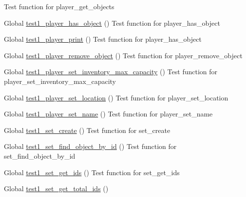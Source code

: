 \begin{DoxyRefList}
%
Test function for player\+\_\+get\+\_\+objects  
\item[Global \mbox{\hyperlink{player__test_8c_abedc0e75ebffb4e7224f5e5ac0ee3055}{test1\+\_\+player\+\_\+has\+\_\+object}} ()]\label{test__test000149}%
%
Test function for player\+\_\+has\+\_\+object  
\item[Global \mbox{\hyperlink{player__test_8c_a7783d860e6e5f7c28befc5d2d30af08b}{test1\+\_\+player\+\_\+print}} ()]\label{test__test000157}%
%
Test function for player\+\_\+has\+\_\+object  
\item[Global \mbox{\hyperlink{player__test_8c_a0685839b423f685dcdabb7b9fe411cd1}{test1\+\_\+player\+\_\+remove\+\_\+object}} ()]\label{test__test000141}%
%
Test function for player\+\_\+remove\+\_\+object  
\item[Global \mbox{\hyperlink{player__test_8c_aed1d8026a0c56c42a1a9d89b887a5e4d}{test1\+\_\+player\+\_\+set\+\_\+inventory\+\_\+max\+\_\+capacity}} ()]\label{test__test000154}%
%
Test function for player\+\_\+set\+\_\+inventory\+\_\+max\+\_\+capacity  
\item[Global \mbox{\hyperlink{player__test_8c_aec6799a4f46c3f3c471fcb668addcad4}{test1\+\_\+player\+\_\+set\+\_\+location}} ()]\label{test__test000144}%
%
Test function for player\+\_\+set\+\_\+location  
\item[Global \mbox{\hyperlink{player__test_8c_a9d87c09e6af910d695265e3fd77ae3a2}{test1\+\_\+player\+\_\+set\+\_\+name}} ()]\label{test__test000128}%
%
Test function for player\+\_\+set\+\_\+name  
\item[Global \mbox{\hyperlink{set__test_8c_a6f654ab4b44e8a9b9cedfb78c378a5d7}{test1\+\_\+set\+\_\+create}} ()]\label{test__test000160}%
%
Test function for set\+\_\+create  
\item[Global \mbox{\hyperlink{set__test_8c_a4e1cb4b064b88a074cc4e144827d03dd}{test1\+\_\+set\+\_\+find\+\_\+object\+\_\+by\+\_\+id}} ()]\label{test__test000179}%
%
Test function for set\+\_\+find\+\_\+object\+\_\+by\+\_\+id  
\item[Global \mbox{\hyperlink{set__test_8c_a5121f8a96087a7f941ffb785d3f826c9}{test1\+\_\+set\+\_\+get\+\_\+ids}} ()]\label{test__test000193}%
%
Test function for set\+\_\+get\+\_\+ids  
\item[Global \mbox{\hyperlink{set__test_8c_a31f1c6b37046c1c8d8fc6175ce78f175}{test1\+\_\+set\+\_\+get\+\_\+total\+\_\+ids}} ()]\label{test__test000173}%

\end{DoxyRefList}
